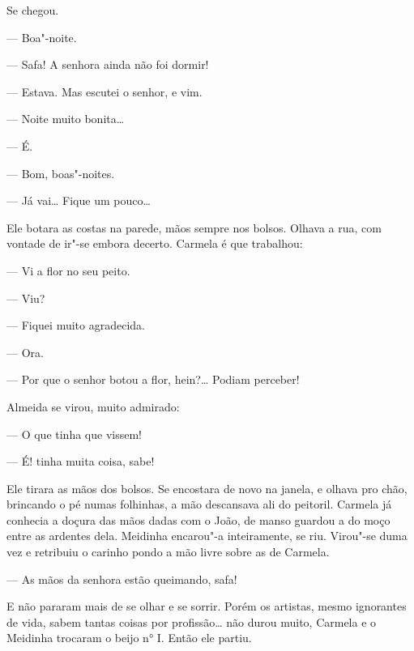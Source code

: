 Se chegou.

--- Boa"-noite.

--- Safa! A senhora ainda não foi dormir!

--- Estava. Mas escutei o senhor, e vim.

--- Noite muito bonita\ldots{}

--- É.

--- Bom, boas"-noites.

--- Já vai\ldots{} Fique um pouco\ldots{}

Ele botara as costas na parede, mãos sempre nos bolsos. Olhava a rua,
com vontade de ir"-se embora decerto. Carmela é que trabalhou:

--- Vi a flor no seu peito.

--- Viu?

--- Fiquei muito agradecida.

--- Ora.

--- Por que o senhor botou a flor, hein?\ldots{} Podiam perceber!

Almeida se virou, muito admirado:

--- O que tinha que vissem!

--- É! tinha muita coisa, sabe! 

Ele tirara as mãos dos bolsos. Se encostara de novo na janela, e olhava
pro chão, brincando o pé numas folhinhas, a mão descansava ali do
peitoril. Carmela já conhecia a doçura das mãos dadas com o João, de
manso guardou a do moço entre as ardentes dela. Meidinha encarou"-a
inteiramente, se riu. Virou"-se duma vez e retribuiu o carinho pondo a
mão livre sobre as de Carmela.

--- As mãos da senhora estão queimando, safa!

E não pararam mais de se olhar e se sorrir. Porém os artistas, mesmo
ignorantes de vida, sabem tantas coisas por profissão\ldots{} não durou
muito, Carmela e o Meidinha trocaram o beijo n° I. Então ele partiu.

